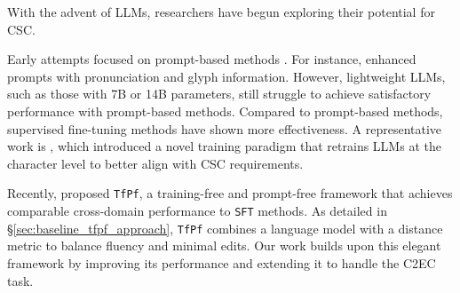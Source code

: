 With the advent of LLMs, researchers have begun exploring their potential for CSC.

Early attempts focused on prompt-based methods \cite{li-etal-2023-ineffectiveness}.
For instance, \citet{dong-etal-2024-rich} enhanced prompts with pronunciation and glyph information.
However, lightweight LLMs, such as those with 7B or 14B parameters, still struggle to achieve satisfactory performance with prompt-based methods.
Compared to prompt-based methods, supervised fine-tuning methods have shown more effectiveness.
A representative work is \citet{li-etal-2024-cllm}, which introduced a novel training paradigm that retrains LLMs at the character level to better align with CSC requirements.

Recently, \citet{zhou-etal-2024-simple} proposed \texttt{TfPf}, a training-free and prompt-free framework that achieves comparable cross-domain performance to \texttt{SFT} methods.
As detailed in \S\ref{sec:baseline_tfpf_approach}, \texttt{TfPf} combines a language model with a distance metric to balance fluency and minimal edits.
Our work builds upon this elegant framework by improving its performance and extending it to handle the C2EC task.
